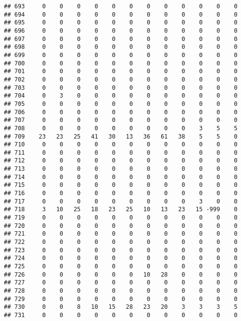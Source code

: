 \documentclass[]{article}
\begin{document}
\begin{verbatim}
## 693     0    0    0    0    0    0    0    0    0    0    0    0
## 694     0    0    0    0    0    0    0    0    0    0    0    0
## 695     0    0    0    0    0    0    0    0    0    0    0    0
## 696     0    0    0    0    0    0    0    0    0    0    0    0
## 697     0    0    0    0    0    0    0    0    0    0    0    0
## 698     0    0    0    0    0    0    0    0    0    0    0    0
## 699     0    0    0    0    0    0    0    0    0    0    0    0
## 700     0    0    0    0    0    0    0    0    0    0    0    0
## 701     0    0    0    0    0    0    0    0    0    0    0    0
## 702     0    0    0    0    0    0    0    0    0    0    0    0
## 703     0    0    0    0    0    0    0    0    0    0    0    0
## 704     0    3    0    0    0    0    0    0    0    0    0    0
## 705     0    0    0    0    0    0    0    0    0    0    0    0
## 706     0    0    0    0    0    0    0    0    0    0    0    0
## 707     0    0    0    0    0    0    0    0    0    0    0    0
## 708     0    0    0    0    0    0    0    0    0    3    5    5
## 709    23   23   25   41   30   13   36   61   38    5    5    0
## 710     0    0    0    0    0    0    0    0    0    0    0    0
## 711     0    0    0    0    0    0    0    0    0    0    0    0
## 712     0    0    0    0    0    0    0    0    0    0    0    0
## 713     0    0    0    0    0    0    0    0    0    0    0    0
## 714     0    0    0    0    0    0    0    0    0    0    0    0
## 715     0    0    0    0    0    0    0    0    0    0    0    0
## 716     0    0    0    0    0    0    0    0    0    0    0    0
## 717     0    0    0    0    0    0    0    0    0    3    0    0
## 718     3   10   25   18   23   25   10   13   23   15 -999    0
## 719     0    0    0    0    0    0    0    0    0    0    0    0
## 720     0    0    0    0    0    0    0    0    0    0    0    0
## 721     0    0    0    0    0    0    0    0    0    0    0    0
## 722     0    0    0    0    0    0    0    0    0    0    0    0
## 723     0    0    0    0    0    0    0    0    0    0    0    0
## 724     0    0    0    0    0    0    0    0    0    0    0    0
## 725     0    0    0    0    0    0    0    0    0    0    0    0
## 726     0    0    0    0    0    0   10   28    0    0    0    0
## 727     0    0    0    0    0    0    0    0    0    0    0    0
## 728     0    0    0    0    0    0    0    0    0    0    0    0
## 729     0    0    0    0    0    0    0    0    0    0    0    0
## 730     0    0    8   10   15   28   23   20    3    3    3    5
## 731     0    0    0    0    0    0    0    0    0    0    0    0

\end{verbatim}
\end{document}
